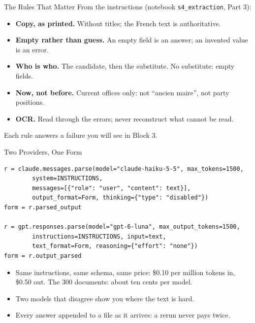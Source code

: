 \documentclass[svgnames,x11names,dvipsnames]{beamer}
\begin{document}
\begin{frame}{The Rules That Matter}
\small
From the instructions (notebook \texttt{s4\_extraction}, Part 3):
\begin{itemize}
    \setlength{\itemsep}{5pt}
    \item \textbf{Copy, as printed.} Without titles; the French text is authoritative.
    \item \textbf{Empty rather than guess.} An empty field is an answer; an invented value is an error.
    \item \textbf{Who is who.} The candidate, then the substitute. No substitute: empty fields.
    \item \textbf{Now, not before.} Current offices only: not ``ancien maire'', not party positions.
    \item \textbf{OCR.} Read through the errors; never reconstruct what cannot be read.
\end{itemize}

\vspace{0.4cm}
Each rule answers a failure you will see in Block 3.
\end{frame}

\begin{frame}[fragile]{Two Providers, One Form}
\scriptsize
\begin{verbatim}
r = claude.messages.parse(model="claude-haiku-5-5", max_tokens=1500,
        system=INSTRUCTIONS,
        messages=[{"role": "user", "content": text}],
        output_format=Form, thinking={"type": "disabled"})
form = r.parsed_output

r = gpt.responses.parse(model="gpt-6-luna", max_output_tokens=1500,
        instructions=INSTRUCTIONS, input=text,
        text_format=Form, reasoning={"effort": "none"})
form = r.output_parsed
\end{verbatim}

\vspace{0.3cm}
\small
\begin{itemize}
    \setlength{\itemsep}{4pt}
    \item Same instructions, same schema, same price: \$0.10 per million tokens in, \$0.50 out. The 300 documents: about ten cents per model.
    \item Two models that disagree show you where the text is hard.
    \item Every answer appended to a file as it arrives: a rerun never pays twice.
\end{itemize}
\end{frame}
\end{document}
